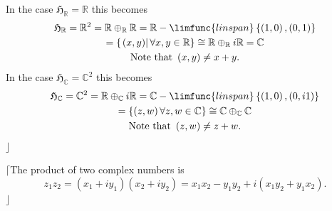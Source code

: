 \documentclass[aps,preprint]{revtex4}
\begin{document}
\begin{enumerate}
In the case $\mathfrak{H}_{\mathbb{R}}=\mathbb{R}$ this becomes%
\begin{gather}
\mathfrak{H}_{\mathbb{R}}=\mathbb{R}^{2}=\mathbb{R}\oplus _{\mathbb{R}}%
\mathbb{R}=\mathbb{R}-\limfunc{linspan}\left\{ \left( 1,0\right) ,\left(
0,1\right) \right\} \\
=\left\{ \left. \left( x,y\right) \right\vert \forall x,y\in \mathbb{R}%
\right\} \cong \mathbb{R}\oplus _{\mathbb{R}}i\mathbb{R}=\mathbb{C} \\
\text{Note that }\left( x,y\right) \neq x+y.
\end{gather}%
In the case $\mathfrak{H}_{\mathbb{C}}=\mathbb{C}^{2}$ this becomes%
\begin{gather}
\mathfrak{H}_{\mathbb{C}}=\mathbb{C}^{2}=\mathbb{R}\oplus _{\mathbb{C}}i%
\mathbb{R}=\mathbb{C}-\limfunc{linspan}\left\{ \left( 1,0\right) ,\left(
0,i1\right) \right\} \\
=\left\{ \left( z,w\right) \forall z,w\in \mathbb{C}\right\} \cong \mathbb{C}%
\oplus _{\mathbb{C}}\mathbb{C} \\
\text{Note that }\left( z,w\right) \neq z+w.
\end{gather}%
$\rfloor $

$\lceil $The product of two complex numbers is 
\begin{equation}
z_{1}z_{2}=\left( x_{1}+iy_{1}\right) \left( x_{2}+iy_{2}\right)
=x_{1}x_{2}-y_{1}y_{2}+i\left( x_{1}y_{2}+y_{1}x_{2}\right) .
\end{equation}%
$\rfloor $


\end{enumerate}
\end{document}
